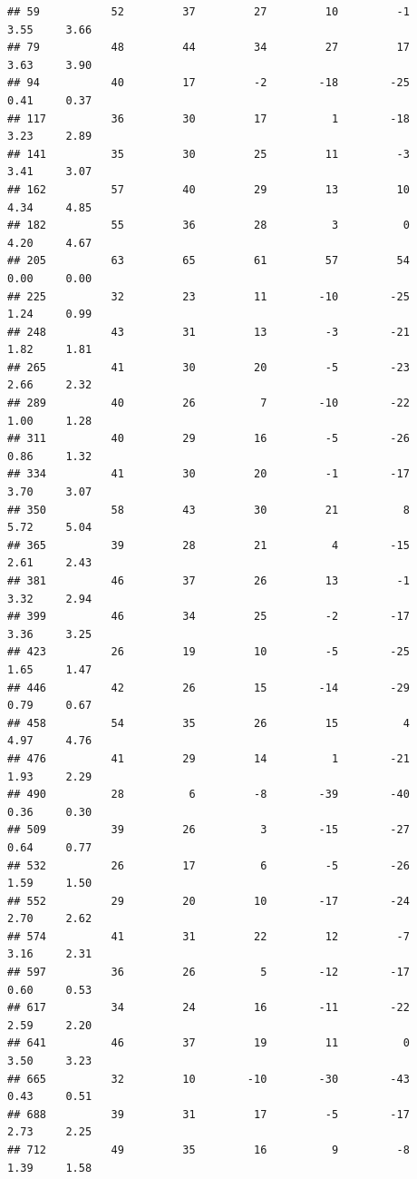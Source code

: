 \documentclass[
]{article}
\begin{document}
\begin{verbatim}
## 59           52         37         27         10         -1     3.55     3.66
## 79           48         44         34         27         17     3.63     3.90
## 94           40         17         -2        -18        -25     0.41     0.37
## 117          36         30         17          1        -18     3.23     2.89
## 141          35         30         25         11         -3     3.41     3.07
## 162          57         40         29         13         10     4.34     4.85
## 182          55         36         28          3          0     4.20     4.67
## 205          63         65         61         57         54     0.00     0.00
## 225          32         23         11        -10        -25     1.24     0.99
## 248          43         31         13         -3        -21     1.82     1.81
## 265          41         30         20         -5        -23     2.66     2.32
## 289          40         26          7        -10        -22     1.00     1.28
## 311          40         29         16         -5        -26     0.86     1.32
## 334          41         30         20         -1        -17     3.70     3.07
## 350          58         43         30         21          8     5.72     5.04
## 365          39         28         21          4        -15     2.61     2.43
## 381          46         37         26         13         -1     3.32     2.94
## 399          46         34         25         -2        -17     3.36     3.25
## 423          26         19         10         -5        -25     1.65     1.47
## 446          42         26         15        -14        -29     0.79     0.67
## 458          54         35         26         15          4     4.97     4.76
## 476          41         29         14          1        -21     1.93     2.29
## 490          28          6         -8        -39        -40     0.36     0.30
## 509          39         26          3        -15        -27     0.64     0.77
## 532          26         17          6         -5        -26     1.59     1.50
## 552          29         20         10        -17        -24     2.70     2.62
## 574          41         31         22         12         -7     3.16     2.31
## 597          36         26          5        -12        -17     0.60     0.53
## 617          34         24         16        -11        -22     2.59     2.20
## 641          46         37         19         11          0     3.50     3.23
## 665          32         10        -10        -30        -43     0.43     0.51
## 688          39         31         17         -5        -17     2.73     2.25
## 712          49         35         16          9         -8     1.39     1.58

\end{verbatim}
\end{document}
